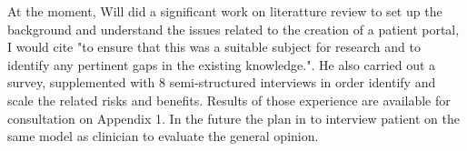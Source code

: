 \newline \vspace{5mm}
At the moment, Will did a significant work on literatture review to set up the background and understand the issues related to the creation of a patient portal, I would cite "to ensure that this was a suitable subject for research and to identify any pertinent gaps in the existing knowledge.".  He also carried out a survey, supplemented with 8 semi-structured interviews in order identify and scale the related risks and benefits. Results of those experience are available for consultation on Appendix 1. In the future the plan in to interview patient on the same model as clinician to evaluate the general opinion.
  











